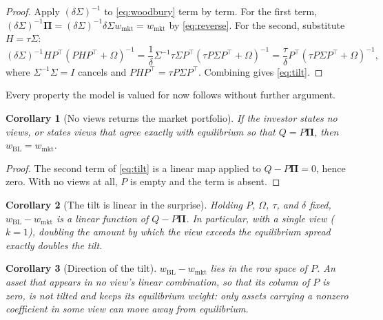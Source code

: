 \documentclass[11pt]{article}
\newtheorem{corollary}{Corollary}
\theoremstyle{remark}
\theoremstyle{definition}
\begin{document}
\begin{proof}
Apply $(\delta\Sigma)^{-1}$ to \eqref{eq:woodbury} term by term. For the first term, $(\delta\Sigma)^{-1}\boldsymbol\Pi = (\delta\Sigma)^{-1}\delta\Sigma w_{\mathrm{mkt}} = w_{\mathrm{mkt}}$ by \eqref{eq:reverse}. For the second, substitute $H = \tau\Sigma$:
\begin{equation*}
(\delta\Sigma)^{-1}HP^\top\left(PHP^\top+\Omega\right)^{-1} = \frac{1}{\delta}\Sigma^{-1}\tau\Sigma P^\top\left(\tau P\Sigma P^\top+\Omega\right)^{-1} = \frac{\tau}{\delta}P^\top\left(\tau P\Sigma P^\top+\Omega\right)^{-1},
\end{equation*}
where $\Sigma^{-1}\Sigma = I$ cancels and $PHP^\top = \tau P\Sigma P^\top$. Combining gives \eqref{eq:tilt}.
\end{proof}

Every property the model is valued for now follows without further argument.

\begin{corollary}[No views returns the market portfolio]
\label{cor:noviews}
If the investor states no views, or states views that agree exactly with equilibrium so that $Q = P\boldsymbol\Pi$, then $w_{\mathrm{BL}} = w_{\mathrm{mkt}}$.
\end{corollary}

\begin{proof}
The second term of \eqref{eq:tilt} is a linear map applied to $Q - P\boldsymbol\Pi = 0$, hence zero. With no views at all, $P$ is empty and the term is absent.
\end{proof}

\begin{corollary}[The tilt is linear in the surprise]
\label{cor:linear}
Holding $P$, $\Omega$, $\tau$, and $\delta$ fixed, $w_{\mathrm{BL}} - w_{\mathrm{mkt}}$ is a linear function of $Q - P\boldsymbol\Pi$. In particular, with a single view ($k=1$), doubling the amount by which the view exceeds the equilibrium spread exactly doubles the tilt.
\end{corollary}

\begin{corollary}[Direction of the tilt]
\label{cor:direction}
$w_{\mathrm{BL}} - w_{\mathrm{mkt}}$ lies in the row space of $P$. An asset that appears in no view's linear combination, so that its column of $P$ is zero, is not tilted and keeps its equilibrium weight: only assets carrying a nonzero coefficient in some view can move away from equilibrium.
\end{corollary}
\end{document}
